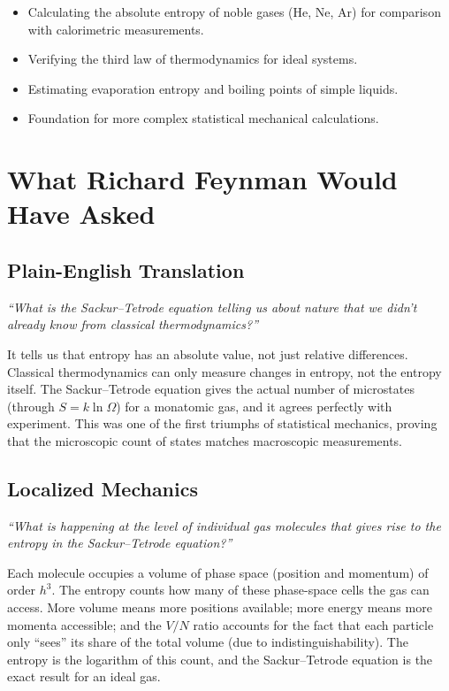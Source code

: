 \begin{itemize}
    \item Calculating the absolute entropy of noble gases (He, Ne, Ar) for comparison with calorimetric measurements.
    \item Verifying the third law of thermodynamics for ideal systems.
    \item Estimating evaporation entropy and boiling points of simple liquids.
    \item Foundation for more complex statistical mechanical calculations.
\end{itemize}
\section*{What Richard Feynman Would Have Asked}

\subsection*{Plain-English Translation}
\textit{``What is the Sackur--Tetrode equation telling us about nature that we didn't already know from classical thermodynamics?''}

It tells us that entropy has an absolute value, not just relative differences. Classical thermodynamics can only measure changes in entropy, not the entropy itself. The Sackur--Tetrode equation gives the actual number of microstates (through $S = k\ln\Omega$) for a monatomic gas, and it agrees perfectly with experiment. This was one of the first triumphs of statistical mechanics, proving that the microscopic count of states matches macroscopic measurements.

\subsection*{Localized Mechanics}
\textit{``What is happening at the level of individual gas molecules that gives rise to the entropy in the Sackur--Tetrode equation?''}

Each molecule occupies a volume of phase space (position and momentum) of order $h^3$. The entropy counts how many of these phase-space cells the gas can access. More volume means more positions available; more energy means more momenta accessible; and the $V/N$ ratio accounts for the fact that each particle only ``sees'' its share of the total volume (due to indistinguishability). The entropy is the logarithm of this count, and the Sackur--Tetrode equation is the exact result for an ideal gas.

